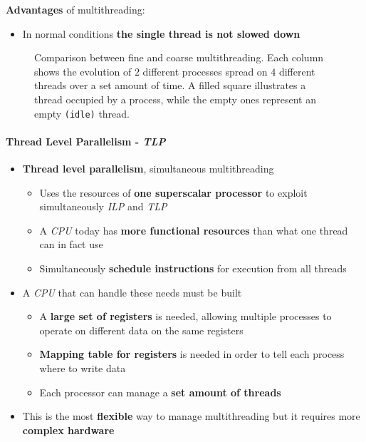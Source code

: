 \documentclass[english]{article}
\begin{document}
\textbf{Advantages} of multithreading:
\begin{itemize}[label=\cmarkthin]
  \item In normal conditions \textbf{the single thread is not slowed down}
\end{itemize}

\begin{figure}[htbp]
  \bigskip
  \centering
  \caption{\centering Comparison between fine and coarse multithreading. Each column shows the evolution of \(2\) different processes spread on \(4\) different threads over a set amount of time.
    A filled square illustrates a thread occupied by a process, while the empty ones represent an empty \texttt{(idle)} thread.}
  \label{fig:multithreading-fine-coarse-comparison}
  \bigskip
\end{figure}

\paragraph{Thread Level Parallelism - \textit{TLP}}

\begin{itemize}
  \item \textbf{Thread level parallelism}, simultaneous multithreading
        \begin{itemize}
          \item Uses the resources of \textbf{one superscalar processor} to exploit simultaneously \textit{ILP} and \textit{TLP}
          \item A \textit{CPU} today has \textbf{more functional resources} than what one thread can in fact use
          \item Simultaneously \textbf{schedule instructions} for execution from all threads
        \end{itemize}
  \item A \textit{CPU} that can handle these needs must be built
        \begin{itemize}
          \item A \textbf{large set of registers} is needed, allowing multiple processes to operate on different data on the same registers
          \item \textbf{Mapping table for registers} is needed in order to tell each process where to write data
          \item Each processor can manage a \textbf{set amount of threads}
        \end{itemize}
  \item This is the most \textbf{flexible} way to manage multithreading but it requires more \textbf{complex hardware}
\end{itemize}
\bigskip
\end{document}
